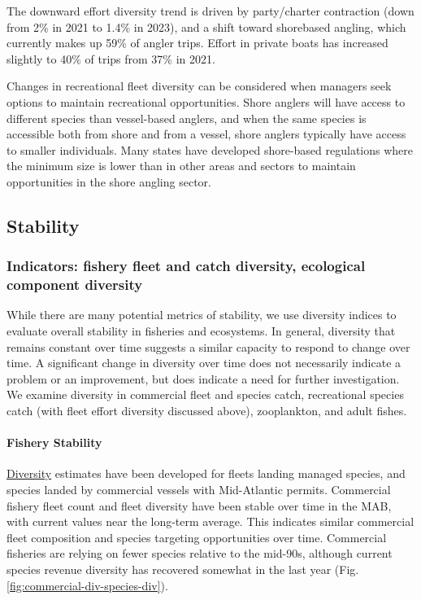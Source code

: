 \documentclass[
  10pt,
]{article}
\begin{document}
The downward effort diversity trend is driven by party/charter contraction (down from 2\% in 2021 to 1.4\% in 2023), and a shift toward shorebased angling, which currently makes up 59\% of angler trips. Effort in private boats has increased slightly to 40\% of trips from 37\% in 2021.

Changes in recreational fleet diversity can be considered when managers seek options to maintain recreational opportunities. Shore anglers will have access to different species than vessel-based anglers, and when the same species is accessible both from shore and from a vessel, shore anglers typically have access to smaller individuals. Many states have developed shore-based regulations where the minimum size is lower than in other areas and sectors to maintain opportunities in the shore angling sector.

\hypertarget{stability}{%
\subsection{Stability}\label{stability}}

\hypertarget{indicators-fishery-fleet-and-catch-diversity-ecological-component-diversity}{%
\subsubsection{Indicators: fishery fleet and catch diversity, ecological component diversity}\label{indicators-fishery-fleet-and-catch-diversity-ecological-component-diversity}}

While there are many potential metrics of stability, we use diversity indices to evaluate overall stability in fisheries and ecosystems. In general, diversity that remains constant over time suggests a similar capacity to respond to change over time. A significant change in diversity over time does not necessarily indicate a problem or an improvement, but does indicate a need for further investigation. We examine diversity in commercial fleet and species catch, recreational species catch (with fleet effort diversity discussed above), zooplankton, and adult fishes.

\hypertarget{fishery-stability}{%
\paragraph{Fishery Stability}\label{fishery-stability}}

\href{https://noaa-edab.github.io/catalog/commercial_div.html}{Diversity} estimates have been developed for fleets landing managed species, and species landed by commercial vessels with Mid-Atlantic permits. Commercial fishery fleet count and fleet diversity have been stable over time in the MAB, with current values near the long-term average. This indicates similar commercial fleet composition and species targeting opportunities over time. Commercial fisheries are relying on fewer species relative to the mid-90s, although current species revenue diversity has recovered somewhat in the last year (Fig. \ref{fig:commercial-div-species-div}).
\end{document}
